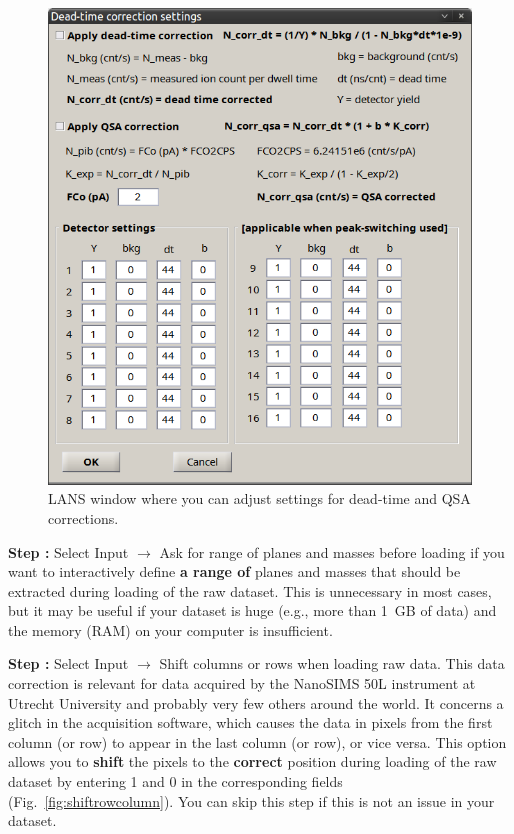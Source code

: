 \documentclass[a4paper, 11pt]{article}
\newcommand{\lans}[1]{{\color{magenta}#1}}
\newcommand\ra{\rightarrow}
\newcounter{step}
\newcommand\s{\addtocounter{step}{1}\vskip5pt\noindent\textbf{Step \thestep:}{ }}
\newcommand\bb[1]{\textbf{#1}}
\begin{document}
\begin{figure}[!h]
\centering
\includegraphics[scale=0.4]{figs1/LANS-dt-qsa-settings}
\caption{\label{fig:dtqsa}%
LANS window where you can adjust settings for dead-time and QSA corrections.}
\end{figure}

\s Select \lans{Input} $\ra$ \lans{Ask for range of planes and masses before loading} if you want to interactively define \bb{a range of} planes and masses that should be extracted during loading of the raw dataset. This is unnecessary in most cases, but it may be useful if your dataset is huge (e.g., more than 1~GB of data) and the memory (RAM) on your computer is insufficient.

\s Select \lans{Input} $\ra$ \lans{Shift columns or rows when loading raw data}. This data correction is relevant for data acquired by the NanoSIMS 50L instrument at Utrecht University and probably very few others around the world. It concerns a glitch in the acquisition software, which causes the data in pixels from the first column (or row) to appear in the last column (or row), or vice versa. This option allows you to \bb{shift} the pixels to the \bb{correct} position during loading of the raw dataset by entering 1 and 0 in the corresponding fields (Fig.~\ref{fig:shiftrowcolumn}). You can skip this step if this is not an issue in your dataset.
\end{document}
